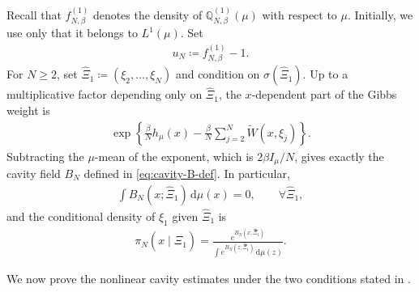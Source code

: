 \documentclass[11pt,reqno]{amsart}
\numberwithin{equation}{section}
\theoremstyle{plain}
\theoremstyle{remark}
\newcommand{\md}{\mathrm{d}}
\newcommand{\Q}{{\mathbb{Q}}}
\newcommand{\tl}{\widetilde}
\newcommand{\be}{\beta}
\begin{document}
Recall that \(f_{N,\be}^{(1)}\) denotes the density of \(\Q_{N,\be}^{(1)}(\mu)\) with respect to \(\mu\).  Initially, we use only that it belongs to \(L^1(\mu)\).  Set
\begin{align}\label{eq:uN-def}
 u_N\coloneqq f_{N,\be}^{(1)}-1.
\end{align}
For \(N\ge2\), set \(\hat\Xi_1\coloneqq(\xi_2,\ldots,\xi_N)\) and condition on \(\sigma(\hat\Xi_1)\).  Up to a multiplicative factor depending only on \(\hat\Xi_1\), the \(x\)-dependent part of the Gibbs weight is
\begin{align}\label{eq:conditional-weight-x}
 \exp\left\{\frac{\be}{N}h_\mu(x)-\frac{\be}{N}\sum_{j=2}^N \tl W(x,\xi_j)\right\}.
\end{align}
Subtracting the \(\mu\)-mean of the exponent, which is \(2\be I_\mu/N\), gives exactly the cavity field \(B_N\) defined in \eqref{eq:cavity-B-def}.  In particular,
\begin{align}\label{eq:B-mean-zero}
 \int B_N(x;\hat\Xi_1)\,\md\mu(x)=0,
 \qquad \forall \hat\Xi_1,
\end{align}
and the conditional density of \(\xi_1\) given \(\hat\Xi_1\) is
\begin{align}\label{eq:conditional-density}
 \pi_N(x\mid \hat\Xi_1)=\frac{e^{B_N(x;\hat\Xi_1)}}{\int e^{B_N(z;\hat\Xi_1)}\,\md\mu(z)}.
\end{align}

We now prove the nonlinear cavity estimates under the two conditions stated in .
\end{document}
